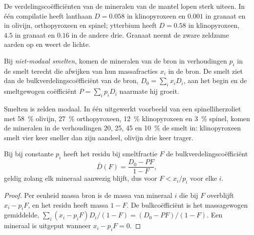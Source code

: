 De verdelingscoëfficiënten van de mineralen van de mantel lopen sterk uiteen. In
één compilatie heeft lanthaan $D = 0.058$ in klinopyroxeen en $0.001$ in
granaat en in olivijn, orthopyroxeen en spinel; ytterbium heeft $D = 0.58$ in
klinopyroxeen, $4.5$ in granaat en $0.16$ in de andere drie. Granaat neemt de
zware zeldzame aarden op en weert de lichte.

\begin{definition}\label{def:b3:trace-element-modelling:nonmodal}
Bij \emph{niet-modaal smelten}, komen de mineralen van de
bron in verhoudingen $p_i$ in de smelt terecht die afwijken van hun massafracties
$x_i$ in de bron. De smelt ziet dan de bulkverdelingscoëfficiënt van de bron,
$D_0 = \sum_i x_iD_i$, aan het begin en de
smeltgewogen coëfficiënt $P = \sum_i p_iD_i$ naarmate hij groeit.
\end{definition}

Smelten is zelden modaal. In één uitgewerkt voorbeeld van een spinelliherzoliet met
\qty{58}{\percent} olivijn, \qty{27}{\percent} orthopyroxeen,
\qty{12}{\percent} klinopyroxeen en \qty{3}{\percent} spinel, komen de mineralen
in de verhoudingen 20, 25, 45 en \qty{10}{\percent} de smelt in:
klinopyroxeen smelt vier keer sneller dan zijn aandeel, olivijn drie keer
trager.

\begin{proposition}
\label{prop:b3:trace-element-modelling:residue}
Bij  bij constante $p_i$ heeft het residu bij smeltfractie $F$
de bulkverdelingscoëfficiënt
\[
\bar D(F) = \frac{D_0 - PF}{1 - F},
\]
geldig zolang elk mineraal aanwezig blijft, dus voor $F < x_i/p_i$ voor elke $i$.
\end{proposition}

\begin{proof}
Per eenheid massa bron is de massa van mineraal $i$ die bij $F$ overblijft $x_i - p_iF$,
en het residu heeft massa $1 - F$. De bulkcoëfficiënt is het massagewogen
gemiddelde, $\sum_i (x_i - p_iF)D_i/(1 - F) = (D_0 - PF)/(1 - F)$. Een mineraal is
uitgeput wanneer $x_i - p_iF = 0$.
\end{proof}


